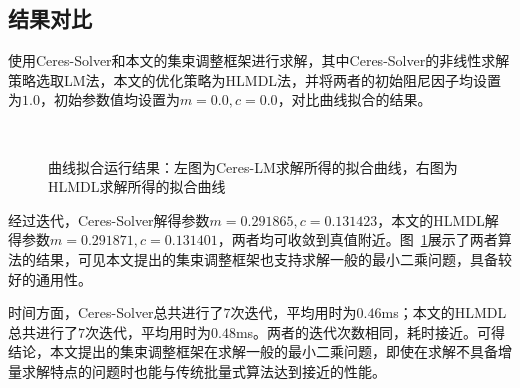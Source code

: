 \subsection{结果对比}

使用Ceres-Solver和本文的集束调整框架进行求解，其中Ceres-Solver的非线性求解策略选取LM法，本文的优化策略为HLMDL法，并将两者的初始阻尼因子均设置为$1.0$，初始参数值均设置为$m=0.0,c=0.0$，对比曲线拟合的结果。

\begin{figure}[htb!]
    \centering
    ~
    \caption{曲线拟合运行结果：左图为Ceres-LM求解所得的拟合曲线，右图为HLMDL求解所得的拟合曲线}
    \label{fig:curve}
\end{figure}

经过迭代，Ceres-Solver解得参数$m=0.291865,c=0.131423$，本文的HLMDL解得参数$m=0.291871,c=0.131401$，两者均可收敛到真值附近。图~\ref{fig:curve}展示了两者算法的结果，可见本文提出的集束调整框架也支持求解一般的最小二乘问题，具备较好的通用性。

时间方面，Ceres-Solver总共进行了$7$次迭代，平均用时为$0.46$ms；本文的HLMDL总共进行了$7$次迭代，平均用时为$0.48$ms。两者的迭代次数相同，耗时接近。可得结论，本文提出的集束调整框架在求解一般的最小二乘问题，即使在求解不具备增量求解特点的问题时也能与传统批量式算法达到接近的性能。

